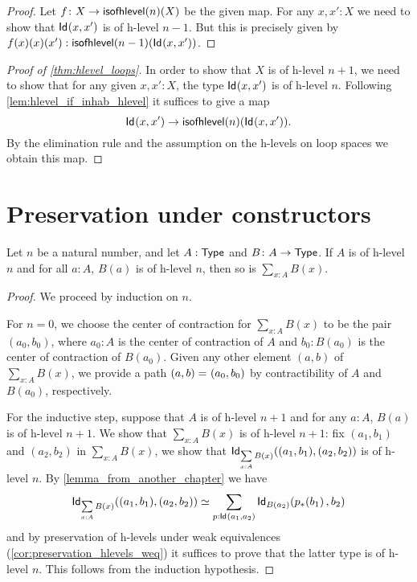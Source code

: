 \begin{proof}
  Let $f \colon X \to \isofhlevel(n)(X)$ be the given map. For any $x, x' : X$ we need to show that
     $\idtype{x}{x'}$ is of h-level $n - 1$. But this is precisely given by
    $f(x)(x)(x') : \isofhlevel(n-1)(\idtype{x}{x'}) $.
\end{proof}


\begin{proof}[Proof of \autoref{thm:hlevel_loops}]
 In order to show that $X$ is of h-level $n+1$, we need to show that for any given $x, x' : X$,
   the type $\idtype{x}{x'}$ is of h-level $n$.
  Following \autoref{lem:hlevel_if_inhab_hlevel} it suffices to give a map
   \[ \idtype{x}{x'} \to \isofhlevel(n)(\idtype{x}{x'})  .\]
  By the elimination rule and the assumption on the h-levels on loop spaces we obtain this map.
\end{proof}

\section{Preservation under constructors}

\begin{thm}
 Let $n$ be a natural number, and let $A : \type$ and $B \colon A \to \type$.
 If $A$ is of h-level $n$ and for all $a : A$, $B(a)$ is of h-level $n$, then so is $\sum\limits_{x : A} B(x)$.
\end{thm}

\begin{proof}
 We proceed by induction on $n$.
 
 For $n = 0$, we choose the center of contraction for $\sum\limits_{x : A} B(x)$ to be the pair
       $(a_0, b_0)$, where $a_0 : A$ is the center of contraction of $A$ and $b_0 : B(a_0)$ is the center of contraction of $B(a_0)$.
       Given any other element $(a,b)$ of $\sum\limits_{x : A} B(x)$, we provide a path $\id{(a, b)}{(a_0,b_0)}$
       by contractibility of $A$ and $B(a_0)$, respectively.
 
 For the inductive step, suppose that $A$ is of h-level $n+1$ and
         for any $a : A$, $B(a)$ is of h-level $n + 1$. We show that $\sum\limits_{x : A} B(x)$ is
         of h-level $n + 1$:
      fix $(a_1, b_1)$ and $(a_2,b_2)$ in $\sum\limits_{x : A} B(x)$,
     we show that $\idtype[\sum\limits_{x : A} B(x)]{(a_1, b_1)}{(a_2,b_2)}$ is of h-level $n$.
      By \autoref{lemma_from_another_chapter} we have
      \[ \eqv{\idtype[\sum\limits_{x : A} B(x)]{(a_1, b_1)}{(a_2,b_2)}}{\sum_{p : \idtype{a_1}{a_2}} \idtype[B(a_2)]{\trans{p}{b_1}}{b_2}} \]
   and by preservation of h-levels under weak equivalences (\autoref{cor:preservation_hlevels_weq})
   it suffices to prove that the latter type is of h-level $n$. This follows from the
   induction hypothesis.
\end{proof}


